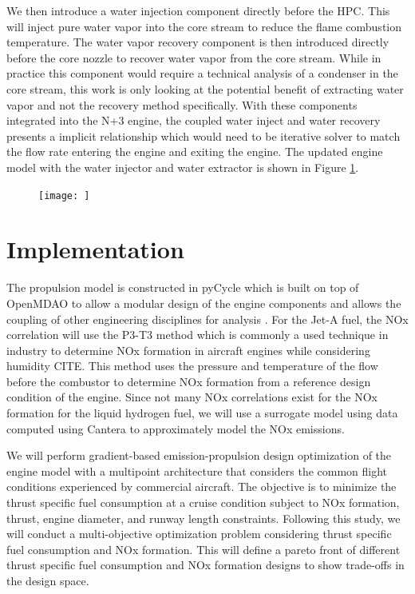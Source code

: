 \documentclass[]{icas2022}
\begin{document}
We then introduce a water injection component directly before the HPC. This will inject pure water vapor into the core stream to reduce the flame combustion temperature. The water vapor recovery component is then introduced directly before the core nozzle to recover water vapor from the core stream. While in practice this component would require a technical analysis of a condenser in the core stream, this work is only looking at the potential benefit of extracting water vapor and not the recovery method specifically. With these components integrated into the N+3 engine, the coupled water inject and water recovery presents a implicit relationship which would need to be iterative solver to match the flow rate entering the engine and exiting the engine. The updated engine model with the water injector and water extractor is shown in Figure \ref{fig:hbtf_cycle_updated}.


\begin{figure}[H]
	\centering
	\texttt{[image: ]}
	\caption{}
	\label{fig:hbtf_cycle_updated}
\end{figure}

\section{Implementation}
\label{sec:imp}
The propulsion model is constructed in pyCycle which is built on top of OpenMDAO to allow a modular design of the engine components and allows the coupling of other engineering disciplines for analysis \cite{openmdao_2019}. For the Jet-A fuel, the NOx correlation will use the P3-T3 method which is commonly a used technique in industry to determine NOx formation in aircraft engines while considering humidity CITE. This method uses the pressure and temperature of the flow before the combustor to determine NOx formation from a reference design condition of the engine. Since not many NOx correlations exist for the NOx formation for the liquid hydrogen fuel, we will use a surrogate model using data computed using Cantera to approximately model the NOx emissions.

We will perform gradient-based emission-propulsion design optimization of the engine model with a multipoint architecture that considers the common flight conditions experienced by commercial aircraft. The objective is to minimize the thrust specific fuel consumption at a cruise condition subject to NOx formation, thrust, engine diameter, and runway length constraints.
Following this study, we will conduct a multi-objective optimization problem considering thrust specific fuel consumption and NOx formation. This will define a pareto front of different thrust specific fuel consumption and NOx formation designs to show trade-offs in the design space.
\end{document}
